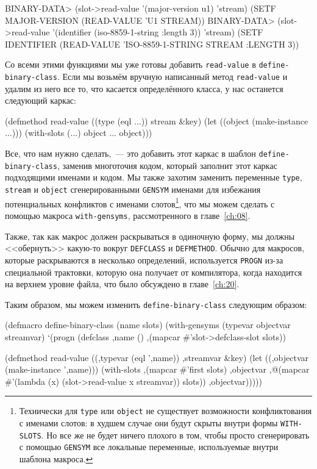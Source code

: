 \begin{myverb}
BINARY-DATA> (slot->read-value '(major-version u1) 'stream)
(SETF MAJOR-VERSION (READ-VALUE 'U1 STREAM))
BINARY-DATA> (slot->read-value '(identifier (iso-8859-1-string :length 3)) 'stream)
(SETF IDENTIFIER (READ-VALUE 'ISO-8859-1-STRING STREAM :LENGTH 3))
\end{myverb}

Со всеми этими функциями мы уже готовы добавить \lstinline{read-value} в
\lstinline{define-binary-class}. Если мы возьмём вручную написанный метод \lstinline{read-value} и
удалим из него все то, что касается определённого класса, у нас останется следующий
каркас:

\begin{myverb}
(defmethod read-value ((type (eql ...)) stream &key)
  (let ((object (make-instance ...)))
    (with-slots (...) object
      ...
    object)))
\end{myverb}

Все, что нам нужно сделать,~--- это добавить этот каркас в шаблон \lstinline{define-binary-class},
заменив многоточия кодом, который заполнит этот каркас подходящими именами и кодом. Мы
также захотим заменить переменные \lstinline{type}, \lstinline{stream} и \lstinline{object}
сгенерированными \lstinline{GENSYM} именами для избежания потенциальных конфликтов с именами
слотов\footnote{Технически для \lstinline{type} или \lstinline{object} не существует возможности
  конфликтования с именами слотов: в худшем случае они будут скрыты внутри формы
  \lstinline{WITH-SLOTS}. Но все же не будет ничего плохого в том, чтобы просто
  сгенерировать с помощью \lstinline{GENSYM} все локальные переменные, используемые внутри
  шаблона макроса.}\hspace{\footnotenegspace}, что мы можем сделать с помощью макроса \lstinline{with-gensyms},
рассмотренного в главе~\ref{ch:08}.

Также, так как макрос должен раскрываться в одиночную форму, мы должны <<обернуть>>
какую-то вокруг \lstinline{DEFCLASS} и \lstinline{DEFMETHOD}. Обычно для макросов, которые
раскрываются в несколько определений, используется \lstinline{PROGN} из-за спе\-циаль\-ной
трактовки, которую она получает от компилятора, когда находится на верхнем уровне файла,
что было обсуждено в главе~\ref{ch:20}.

Таким образом, мы можем изменить \lstinline{define-binary-class} следующим образом:

\begin{myverb}
(defmacro define-binary-class (name slots)
  (with-gensyms (typevar objectvar streamvar)
    `(progn
       (defclass ,name ()
         ,(mapcar #'slot->defclass-slot slots))

       (defmethod read-value ((,typevar (eql ',name)) ,streamvar &key)
         (let ((,objectvar (make-instance ',name)))
           (with-slots ,(mapcar #'first slots) ,objectvar
             ,@(mapcar #'(lambda (x) (slot->read-value x streamvar)) slots))
           ,objectvar)))))
\end{myverb}


